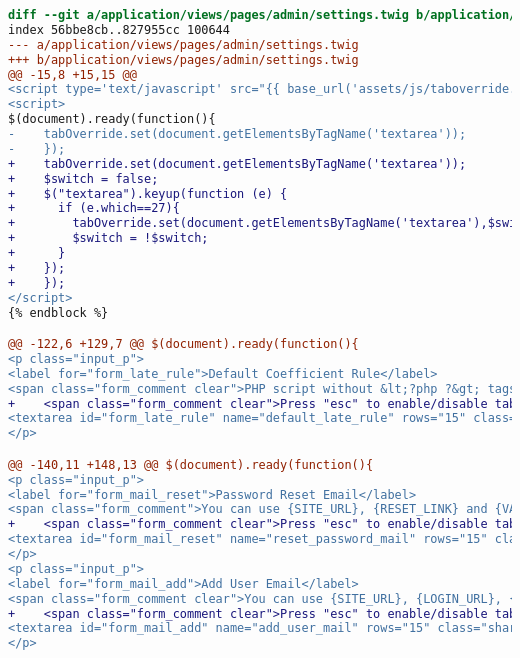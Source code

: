 \begin{lstlisting}[language=diff, caption=Perubahan untuk mematuhi kriteria 2.1.2, label=lst_2.1.2, basicstyle=\ttfamily, frame=single,
columns=fullflexible, keepspaces=true, breaklines=true]
diff --git a/application/views/pages/admin/settings.twig b/application/views/pages/admin/settings.twig
index 56bbe8cb..827955cc 100644
--- a/application/views/pages/admin/settings.twig
+++ b/application/views/pages/admin/settings.twig
@@ -15,8 +15,15 @@
<script type='text/javascript' src="{{ base_url('assets/js/taboverride.min.js') }}"></script>
<script>
$(document).ready(function(){
-    tabOverride.set(document.getElementsByTagName('textarea'));
-    });
+    tabOverride.set(document.getElementsByTagName('textarea'));
+    $switch = false;
+    $("textarea").keyup(function (e) {
+      if (e.which==27){
+        tabOverride.set(document.getElementsByTagName('textarea'),$switch);
+        $switch = !$switch;
+      }
+    });
+    });
</script>
{% endblock %}

@@ -122,6 +129,7 @@ $(document).ready(function(){
<p class="input_p">
<label for="form_late_rule">Default Coefficient Rule</label>
<span class="form_comment clear">PHP script without &lt;?php ?&gt; tags</span><br>
+    <span class="form_comment clear">Press "esc" to enable/disable tabindent</span><br>
<textarea id="form_late_rule" name="default_late_rule" rows="15" class="sharif_input add_text clear">{{ default_late_rule }}</textarea>
</p>

@@ -140,11 +148,13 @@ $(document).ready(function(){
<p class="input_p">
<label for="form_mail_reset">Password Reset Email</label>
<span class="form_comment">You can use {SITE_URL}, {RESET_LINK} and {VALID_TIME}</span><br>
+    <span class="form_comment clear">Press "esc" to enable/disable tabindent</span><br>
<textarea id="form_mail_reset" name="reset_password_mail" rows="15" class="sharif_input add_text clear">{{ reset_password_mail }}</textarea>
</p>
<p class="input_p">
<label for="form_mail_add">Add User Email</label>
<span class="form_comment clear">You can use {SITE_URL}, {LOGIN_URL}, {ROLE}, {USERNAME} and {PASSWORD}</span><br>
+    <span class="form_comment clear">Press "esc" to enable/disable tabindent</span><br>
<textarea id="form_mail_add" name="add_user_mail" rows="15" class="sharif_input add_text clear">{{ add_user_mail }}</textarea>
</p>


\end{lstlisting}
